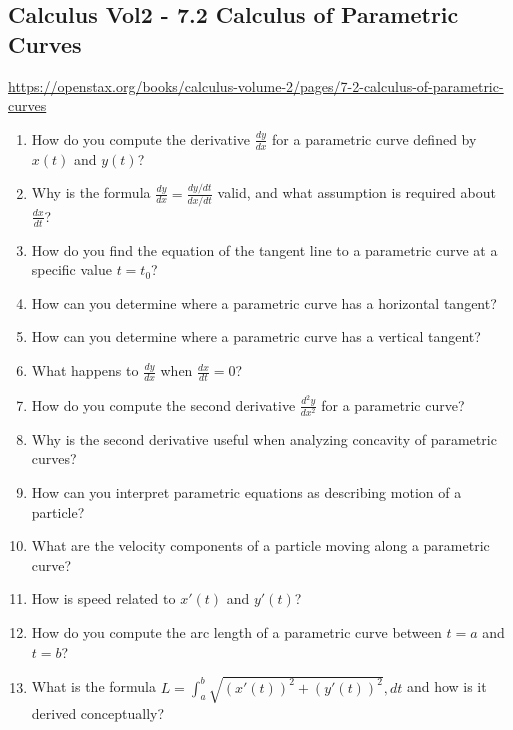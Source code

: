 \subsection{Calculus Vol2 - 7.2 Calculus of Parametric Curves}

\url{https://openstax.org/books/calculus-volume-2/pages/7-2-calculus-of-parametric-curves}

\begin{enumerate}

\item How do you compute the derivative $\frac{dy}{dx}$ for a parametric curve defined by $x(t)$ and $y(t)$?

\item Why is the formula $\frac{dy}{dx} = \frac{dy/dt}{dx/dt}$ valid, and what assumption is required about $\frac{dx}{dt}$?

\item How do you find the equation of the tangent line to a parametric curve at a specific value $t=t_0$?

\item How can you determine where a parametric curve has a horizontal tangent?

\item How can you determine where a parametric curve has a vertical tangent?

\item What happens to $\frac{dy}{dx}$ when $\frac{dx}{dt} = 0$?

\item How do you compute the second derivative $\frac{d^2 y}{dx^2}$ for a parametric curve?

\item Why is the second derivative useful when analyzing concavity of parametric curves?

\item How can you interpret parametric equations as describing motion of a particle?

\item What are the velocity components of a particle moving along a parametric curve?

\item How is speed related to $x'(t)$ and $y'(t)$?

\item How do you compute the arc length of a parametric curve between $t=a$ and $t=b$?

\item What is the formula $L = \int_a^b \sqrt{(x'(t))^2 + (y'(t))^2},dt$ and how is it derived conceptually?


\end{enumerate}
